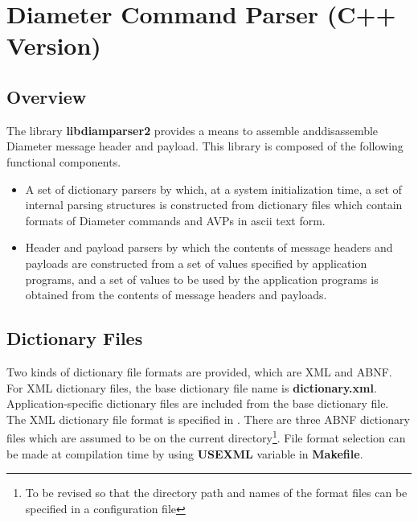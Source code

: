 
\section{Diameter Command Parser (C++ Version)}

\subsection{Overview}

The library {\bf libdiamparser2} provides a means to 
assemble anddisassemble Diameter message header and payload.  This library 
is composed of the following functional components.

\begin{itemize}
 \item A set of dictionary parsers by which, at a system initialization
 time, a set of internal parsing structures is constructed from
 dictionary files which contain formats of Diameter commands and AVPs in
 ascii text form.

 \item Header and payload parsers by which the contents of message
 headers and payloads are constructed from a set of values specified by
 application programs, and a set of values to be used by the application
 programs is obtained from the contents of message headers and payloads.
\end{itemize}

\subsection{Dictionary Files}

Two kinds of dictionary file formats are provided, which are XML and
ABNF.  For XML dictionary files, the base dictionary file name is {\bf
dictionary.xml}.  Application-specific dictionary files are included
from the base dictionary file.  The XML dictionary file format is
specified in \cite{diameter-xml}.  There are three ABNF dictionary files
which are assumed to be on the current directory\footnote{To be revised
so that the directory path and names of the format files can be
specified in a configuration file}.  File format selection can be made
at compilation time by using {\bf USEXML} variable in {\bf Makefile}.


